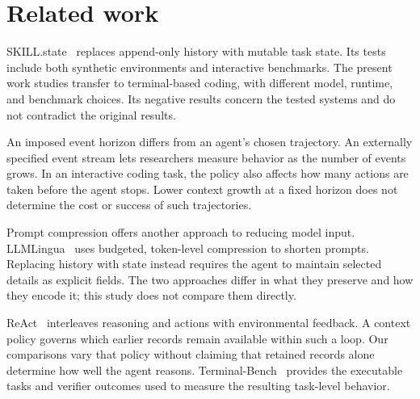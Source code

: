 \section{Related work}
\label{sec:related}

SKILL.state~\citep{skillstate2026} replaces append-only history with mutable
task state. Its tests include both synthetic environments and
interactive benchmarks. The present work studies transfer to terminal-based
coding, with different model, runtime, and benchmark choices. Its negative
results concern the tested systems and do not contradict the original
results.

An imposed event horizon differs from an agent's chosen trajectory.
An externally specified event stream lets researchers measure behavior as
the number of events grows. In an interactive
coding task, the policy also affects how many actions are taken before
the agent stops. Lower context growth at a fixed horizon does not determine
the cost or success of such trajectories.

Prompt compression offers another approach to reducing model
input. LLMLingua~\citep{llmlingua2023} uses budgeted, token-level compression
to shorten prompts. Replacing history with state instead requires the agent
to maintain selected details as explicit fields. The two approaches differ
in what they preserve and how they encode it; this study does not compare
them directly.

ReAct~\citep{react2022} interleaves reasoning and actions with environmental
feedback. A context policy governs which earlier records remain available
within such a loop. Our comparisons vary that policy without claiming that
retained records alone determine how well the agent reasons.
Terminal-Bench~\citep{terminalbench} provides the
executable tasks and verifier outcomes used to measure the resulting
task-level behavior.
